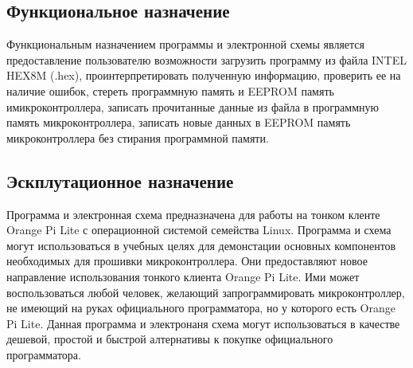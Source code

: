 \subsection{Функциональное назначение}
Функциональным назначением программы и электронной схемы является предоставление пользователю возможности загрузить программу из файла INTEL HEX8M (.hex), проинтерпретировать полученную информацию, проверить ее на наличие ошибок, стереть программную память и EEPROM память имикроконтроллера, записать прочитанные данные из файла в программную память микроконтроллера, записать новые данных в EEPROM память микроконтроллера без стирания программной памяти. 

\subsection{Эскплутационное назначение}
Программа и электронная схема предназначена для работы на тонком кленте Orange Pi Lite с операционной системой семейства Linux. Программа и схема могут использоваться в учебных целях для демонстации основных компонентов необходимых для прошивки микроконтроллера. Они предоставляют новое направление использования тонкого клиента Orange Pi Lite. Ими может воспользоваться любой человек, желающий запрограммировать микроконтроллер, не имеющий на руках официального программатора, но у которого есть Orange Pi Lite. Данная программа и электронаня схема могут использоваться в качестве дешевой, простой и быстрой алтернативы к покупке официального программатора.
